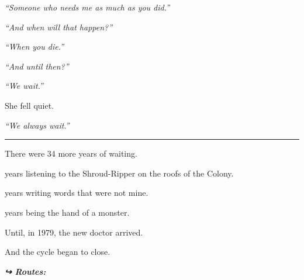 \noindent \textit{\textquotedblleft{}Someone who needs me as much as you did.\textquotedblright{}}

\noindent \textit{\textquotedblleft{}And when will that happen?\textquotedblright{}}

\noindent \textit{\textquotedblleft{}When you die.\textquotedblright{}}

\noindent \textit{\textquotedblleft{}And until then?\textquotedblright{}}

\noindent \textit{\textquotedblleft{}We wait.\textquotedblright{}}

\noindent She fell quiet.

\noindent \textit{\textquotedblleft{}We always wait.\textquotedblright{}}

\vspace{0.5em}\noindent\rule{\textwidth}{0.5pt}\vspace{0.5em}

\noindent There were 34 more years of waiting.

 years listening to the Shroud-Ripper on the roofs of the Colony.

 years writing words that were not mine.

 years being the hand of a monster.

\noindent Until, in 1979, the new doctor arrived.

\noindent And the cycle began to close.

\vspace{0.5em}
\noindent\textit{\textbf{↪ Routes:}  \rotasep {} \rotasep {}}
